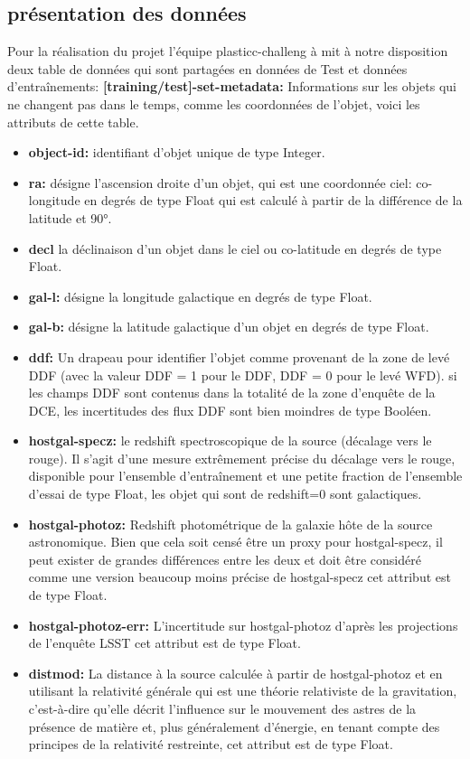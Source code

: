 \subsection{présentation des données}
Pour la réalisation du projet  l’équipe plasticc-challeng à mit à notre disposition deux table de données qui sont partagées  en données de Test et données d'entraînements:
 \newline
 \newline
 \textbf {[training/test]-set-metadata:} Informations sur les objets qui ne changent pas dans le temps, comme les coordonnées de l'objet, voici les attributs de cette table.

\begin{itemize}
    \item \textbf {object-id:} identifiant d'objet unique de type Integer.
    \item \textbf {ra:} désigne l’ascension droite d’un objet, qui est une coordonnée ciel: co-longitude en degrés de type Float qui est calculé à partir de la différence de la latitude et 90°. 
    \item \textbf {decl} la déclinaison d’un objet dans le ciel ou co-latitude en degrés de type Float. 
    \item \textbf {gal-l:} désigne la longitude galactique en degrés de type Float. 
    \item \textbf {gal-b:} désigne la latitude galactique d'un objet en degrés de type Float.
    \item \textbf {ddf:} Un drapeau pour identifier l’objet comme provenant de la zone de levé DDF (avec la valeur DDF = 1 pour le DDF, DDF = 0 pour le levé WFD). si les champs DDF sont contenus dans la totalité de la zone d’enquête de la DCE, les incertitudes des flux DDF sont bien moindres de type Booléen.
    \item \textbf {hostgal-specz:} le redshift spectroscopique de la source (décalage vers le rouge). Il s'agit d'une mesure extrêmement précise du décalage vers le rouge, disponible pour l'ensemble d'entraînement et une petite fraction de l'ensemble d'essai de type Float, les objet qui sont de redshift=0 sont galactiques.
    \item \textbf {hostgal-photoz:} Redshift photométrique de la galaxie hôte de la source astronomique. Bien que cela soit censé être un proxy pour hostgal-specz, il peut exister de grandes différences entre les deux et doit être considéré comme une version beaucoup moins précise de hostgal-specz cet attribut est de type Float.
    \item \textbf {hostgal-photoz-err:}  L'incertitude sur hostgal-photoz d'après les projections de l'enquête LSST cet attribut est de type Float.  
    \item \textbf { distmod:} La distance à la source calculée à partir de hostgal-photoz et en utilisant la relativité générale qui est une théorie relativiste de la gravitation, c'est-à-dire qu'elle décrit l'influence sur le mouvement des astres de la présence de matière et, plus généralement d'énergie, en tenant compte des principes de la relativité restreinte, cet attribut est de type Float.
   

\end{itemize}
